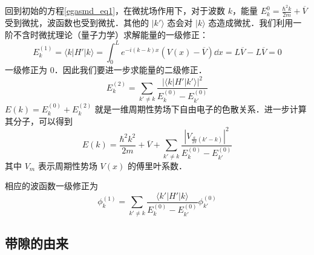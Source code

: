 回到初始的方程\autoref{egasmd_eq1}，在微扰场作用下，对于波数 $k$，能量 $E_k^{0}=\frac{\hbar^2 k}{2m}+\overline V$ 受到微扰，波函数也受到微扰．其他的 $|k'\rangle$ 态会对 $|k\rangle$ 态造成微扰．我们利用一阶不含时微扰理论（量子力学）求解能量的一级修正：
\begin{equation}
E_k^{(1)}=\langle k|H'|k\rangle=\int_0^L e^{-i(k-k)x}(V(x)-\overline V)\dd x=L\overline V-L\overline V=0
\end{equation}
一级修正为 $0$．因此我们要进一步求能量的二级修正．
\begin{equation}
E_k^{(2)}=\sum_{k'\neq k}\frac{|\langle k|H'|k'\rangle|^2}{E_k^{(0)}-E_{k'}^{(0)}}
\end{equation}
$E(k)=E_k^{(0)}+E_k^{(2)}$ 就是一维周期性势场下自由电子的色散关系．进一步计算其分子，可以得到
\begin{equation}
E(k)=\frac{\hbar^2 k^2}{2m}+\overline V+\sum_{k'\neq k} \frac{|V_{\frac{a}{2\pi}(k'-k)}|^2}{E_k^{(0)}-E_{k'}^{(0)}}
\end{equation}
其中 $V_m$ 表示周期性势场 $V(x)$ 的傅里叶系数．

相应的波函数一级修正为
\begin{equation}
\phi_k^{(1)}=\sum_{k'\neq k}\frac{\langle k'|H'|k\rangle}{E_k^{(0)}-E_{k'}^{(0)}} \phi_{k'}^{(0)}
\end{equation}

\subsection{带隙的由来}